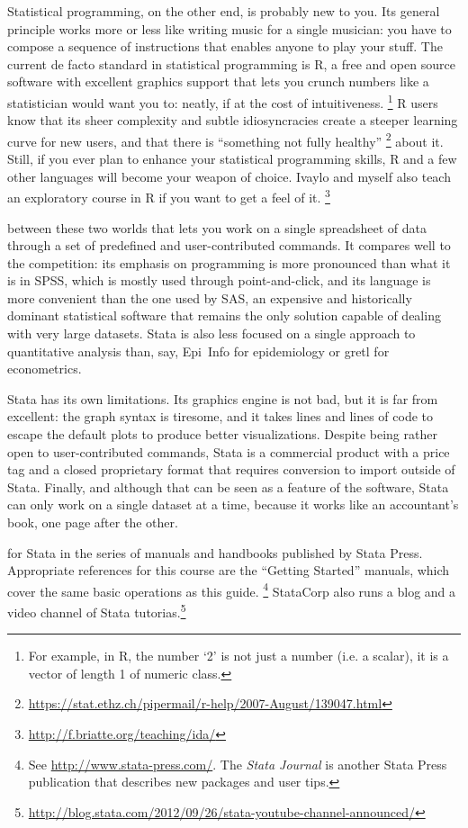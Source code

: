 Statistical programming, on the other end, is probably new to you. Its general principle works more or less like writing music for a single musician: you have to compose a sequence of instructions that enables anyone to play your stuff. The current de facto standard in statistical programming is R, a free and open source software with excellent graphics support that lets you crunch numbers like a statistician would want you to: neatly, if at the cost of intuitiveness.%
	\footnote{For example, in R, the number `2' is not just a number (i.e. a scalar), it is a vector of length 1 of numeric class.} %
 	R users know that its sheer complexity and subtle idiosyncracies create a steeper learning curve for new users, and that there is ``something not fully healthy''%
	\footnote{%
		\url{https://stat.ethz.ch/pipermail/r-help/2007-August/139047.html}} %
		about it. Still, if you ever plan to enhance your statistical programming skills, R and a few other languages will become your weapon of choice. Ivaylo and myself also teach an exploratory course in R if you want to get a feel of it.%
	\footnote{\url{http://f.briatte.org/teaching/ida/}}%
%
%

 between these two worlds that lets you work on a single spreadsheet of data through a set of predefined and user-contributed commands. It compares well to the competition: its emphasis on programming is more pronounced than what it is in SPSS, which is mostly used through point-and-click, and its language is more convenient than the one used by SAS, an expensive and historically dominant statistical software that remains the only solution capable of dealing with very large datasets. Stata is also less focused on a single approach to quantitative analysis than, say, Epi~Info for epidemiology or gretl for econometrics.%
	
Stata has its own limitations. Its graphics engine is not bad, but it is far from excellent: the graph syntax is tiresome, and it takes lines and lines of code to escape the default plots to produce better visualizations. Despite being rather open to user-contributed commands, Stata is a commercial product with a price tag and a closed proprietary format that requires conversion to import outside of Stata. Finally, and although that can be seen as a feature of the software, Stata can only work on a single dataset at a time, because it works like an accountant's book, one page after the other.%

 for Stata in the series of manuals and handbooks published by Stata Press. Appropriate references for this course are the ``Getting Started'' manuals, which cover the same basic operations as this guide.%
  \footnote{See \url{http://www.stata-press.com/}. %
  The \emph{Stata Journal} is another Stata Press publication that describes new packages and user tips.}%
  StataCorp also runs a blog and a video channel of Stata tutorias.\footnote{\url{http://blog.stata.com/2012/09/26/stata-youtube-channel-announced/}}
  
